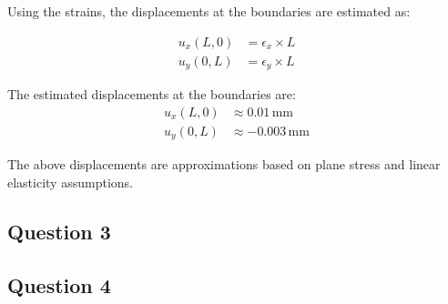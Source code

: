 \documentclass[twoside,twocolumn,10pt]{article}
\begin{document}
Using the strains, the displacements at the boundaries are estimated as:

\begin{equation}
\begin{aligned}
u_x(L, 0) &= \epsilon_x \times L \\
u_y(0, L) &= \epsilon_y \times L
\end{aligned}
\end{equation}

The estimated displacements at the boundaries are:
\begin{equation}
\begin{aligned}
u_x(L, 0) &\approx 0.01 \, \text{mm} \\
u_y(0, L) &\approx -0.003 \, \text{mm}
\end{aligned}
\end{equation}

The above displacements are approximations based on plane stress and linear elasticity assumptions.

\subsection{Question 3}

\subsection{Question 4}
\end{document}
